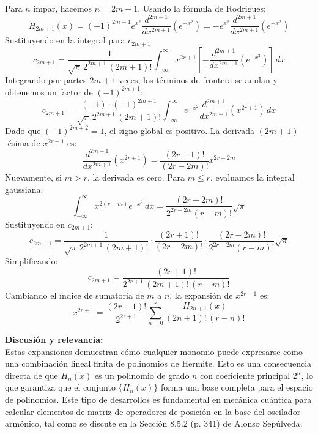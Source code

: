 \documentclass[a4paper]{article}
\begin{document}
Para $n$ impar, hacemos $n = 2m+1$. Usando la fórmula de Rodrigues:
$$
H_{2m+1}(x) = (-1)^{2m+1} e^{x^2} \frac{d^{2m+1}}{dx^{2m+1}} \left( e^{-x^2} \right) = - e^{x^2} \frac{d^{2m+1}}{dx^{2m+1}} \left( e^{-x^2} \right)
$$
Sustituyendo en la integral para $c_{2m+1}$:
$$
c_{2m+1} = \frac{1}{\sqrt{\pi} \, 2^{2m+1} \, (2m+1)!} \int_{-\infty}^{\infty} x^{2r+1} \left[ - \frac{d^{2m+1}}{dx^{2m+1}} \left( e^{-x^2} \right) \right] \, dx
$$
Integrando por partes $2m+1$ veces, los términos de frontera se anulan y obtenemos un factor de $(-1)^{2m+1}$:
$$
c_{2m+1} = \frac{(-1) \cdot (-1)^{2m+1}}{\sqrt{\pi} \, 2^{2m+1} \, (2m+1)!} \int_{-\infty}^{\infty} e^{-x^2} \frac{d^{2m+1}}{dx^{2m+1}} \left( x^{2r+1} \right) \, dx
$$
Dado que $(-1)^{2m+2} = 1$, el signo global es positivo. La derivada $(2m+1)$-ésima de $x^{2r+1}$ es:
$$
\frac{d^{2m+1}}{dx^{2m+1}} \left( x^{2r+1} \right) = \frac{(2r+1)!}{(2r-2m)!} x^{2r-2m}
$$
Nuevamente, si $m > r$, la derivada es cero. Para $m \leq r$, evaluamos la integral gaussiana:
$$
\int_{-\infty}^{\infty} x^{2(r-m)} e^{-x^2} \, dx = \frac{(2r-2m)!}{2^{2r-2m} (r-m)!} \sqrt{\pi}
$$
Sustituyendo en $c_{2m+1}$:
$$
c_{2m+1} = \frac{1}{\sqrt{\pi} \, 2^{2m+1} \, (2m+1)!} \cdot \frac{(2r+1)!}{(2r-2m)!} \cdot \frac{(2r-2m)!}{2^{2r-2m} (r-m)!} \sqrt{\pi}
$$
Simplificando:
$$
c_{2m+1} = \frac{(2r+1)!}{2^{2r+1} \, (2m+1)! \, (r-m)!}
$$
Cambiando el índice de sumatoria de $m$ a $n$, la expansión de $x^{2r+1}$ es:
$$
x^{2r+1} = \frac{(2r+1)!}{2^{2r+1}} \sum_{n=0}^{r} \frac{H_{2n+1}(x)}{(2n+1)! \, (r-n)!}
$$

\vspace{0.3cm}
\noindent\textbf{Discusión y relevancia:} \\
Estas expansiones demuestran cómo cualquier monomio puede expresarse como una combinación lineal finita de polinomios de Hermite. Esto es una consecuencia directa de que $H_n(x)$ es un polinomio de grado $n$ con coeficiente principal $2^n$, lo que garantiza que el conjunto $\{H_n(x)\}$ forma una base completa para el espacio de polinomios. Este tipo de desarrollos es fundamental en mecánica cuántica para calcular elementos de matriz de operadores de posición en la base del oscilador armónico, tal como se discute en la Sección 8.5.2 (p. 341) de Alonso Sepúlveda.
\end{document}
